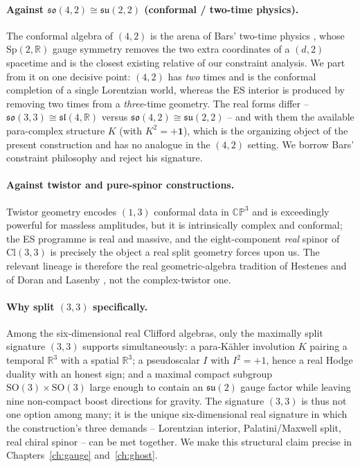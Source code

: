 \documentclass[11pt,oneside]{book}
\newcommand{\Cl}{\mathrm{Cl}}                     %
\newcommand{\RR}{\mathbb{R}}
\newcommand{\su}{\mathfrak{su}}
\newcommand{\so}{\mathfrak{so}}
\theoremstyle{plain}
\theoremstyle{definition}
\theoremstyle{remark}
\begin{document}
\paragraph{Against $\so(4,2)\cong\su(2,2)$ (conformal / two-time physics).} The
conformal algebra of $(4,2)$ is the arena of Bars' two-time physics
\cite{Bars1998a,Bars1998b,Bars2008}, whose $\mathrm{Sp}(2,\RR)$ gauge symmetry
removes the two extra coordinates of a $(d,2)$ spacetime and is the closest
existing relative of our constraint analysis. We part from it on one decisive
point: $(4,2)$ has \emph{two} times and is the conformal completion of a single
Lorentzian world, whereas the ES interior is produced by removing two times from a
\emph{three}-time geometry. The real forms differ -- $\so(3,3)\cong\mathfrak{sl}(4,\RR)$
versus $\so(4,2)\cong\su(2,2)$ -- and with them the available para-complex
structure $K$ (with $K^2=+\mathbf 1$), which is the organizing object of the
present construction and has no analogue in the $(4,2)$ setting. We borrow Bars'
constraint philosophy and reject his signature.

\paragraph{Against twistor and pure-spinor constructions.} Twistor geometry
\cite{Penrose1967} encodes $(1,3)$ conformal data in $\mathbb{CP}^3$ and is
exceedingly powerful for massless amplitudes, but it is intrinsically complex and
conformal; the ES programme is real and massive, and the eight-component
\emph{real} spinor of $\Cl(3,3)$ is precisely the object a real split geometry
forces upon us. The relevant lineage is therefore the real geometric-algebra
tradition of Hestenes and of Doran and Lasenby
\cite{Hestenes1966,DoranLasenby2003,Lounesto2001}, not the complex-twistor one.

\paragraph{Why split $(3,3)$ specifically.} Among the six-dimensional real
Clifford algebras, only the maximally split signature $(3,3)$ supports
simultaneously: a para-K\"ahler involution $K$ pairing a temporal $\RR^3$ with a
spatial $\RR^3$; a pseudoscalar $I$ with $I^2=+1$, hence a real Hodge duality with
an honest sign; and a maximal compact subgroup $\mathrm{SO}(3)\times\mathrm{SO}(3)$
large enough to contain an $\su(2)$ gauge factor while leaving nine non-compact
boost directions for gravity. The signature $(3,3)$ is thus not one option among
many; it is the unique six-dimensional real signature in which the construction's
three demands -- Lorentzian interior, Palatini/Maxwell split, real chiral spinor --
can be met together. We make this structural claim precise in
Chapters~\ref{ch:gauge} and~\ref{ch:ghost}.
\end{document}
